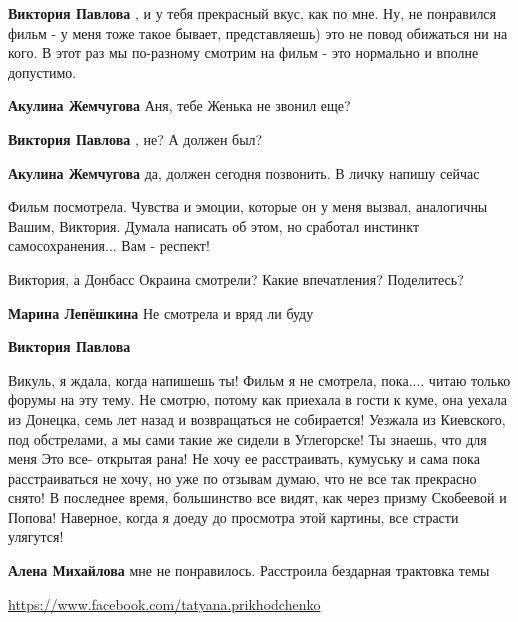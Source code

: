 \begin{itemize}
\begin{itemize}
\textbf{Виктория Павлова} , и у тебя прекрасный вкус, как по мне. Ну, не понравился фильм - у меня тоже такое бывает, представляешь) это не повод обижаться ни на кого. В этот раз мы по-разному смотрим на фильм - это нормально и вполне допустимо.

\textbf{Акулина Жемчугова} Аня, тебе Женька не звонил еще?

\textbf{Виктория Павлова} , не? А должен был?

\textbf{Акулина Жемчугова} да, должен сегодня позвонить. В личку напишу сейчас
\end{itemize} %


Фильм посмотрела. Чувства и эмоции, которые он у меня вызвал, аналогичны Вашим,
Виктория. Думала написать об этом, но сработал инстинкт самосохранения... Вам -
респект!



Виктория, а Донбасс Окраина смотрели? Какие впечатления? Поделитесь?

\begin{itemize} %
\textbf{Марина Лепёшкина} Не смотрела и вряд ли буду

\textbf{Виктория Павлова} 

Викуль, я ждала, когда напишешь ты! Фильм я не смотрела, пока.... читаю только
форумы на эту тему. Не смотрю, потому как приехала в гости к куме, она уехала из
Донецка, семь лет назад и возвращаться не собирается! Уезжала из Киевского, под
обстрелами, а мы сами такие же сидели в Углегорске! Ты знаешь, что для меня Это
все- открытая рана! Не хочу ее расстраивать, кумуську и сама пока
расстраиваться не хочу, но уже по отзывам думаю, что не все так прекрасно снято!
В последнее время, большинство все видят, как через призму Скобеевой и Попова!
Наверное, когда я доеду до просмотра этой картины, все страсти улягутся!


\textbf{Алена Михайлова} мне не понравилось. Расстроила бездарная трактовка темы

\url{https://www.facebook.com/tatyana.prikhodchenko}\par


\end{itemize}
\end{itemize}
